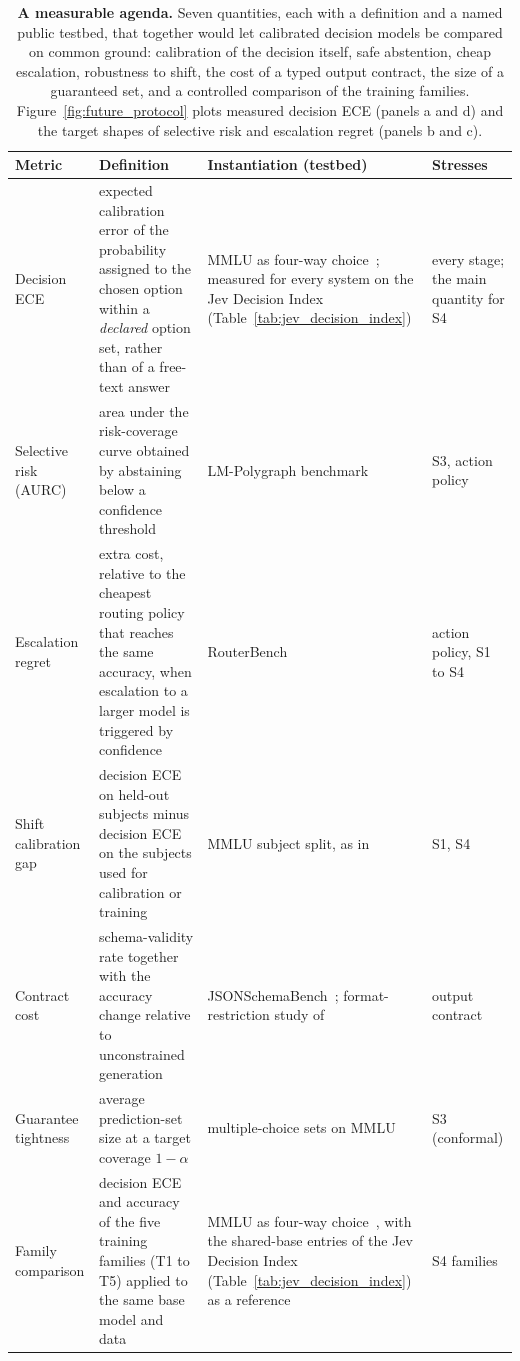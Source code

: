 \begin{table}[tp]
\centering\footnotesize
\renewcommand{\arraystretch}{1.18}
\caption{\textbf{A measurable agenda.} Seven quantities, each with a definition and a named public
testbed, that together would let calibrated decision models be compared on common ground:
calibration of the decision itself, safe abstention, cheap escalation, robustness to shift, the cost
of a typed output contract, the size of a guaranteed set, and a controlled comparison of the training families. Figure~\ref{fig:future_protocol} plots
measured decision ECE (panels a and d) and the target shapes of selective risk and escalation regret
(panels b and c).}
\label{tab:future_metrics}
\begin{tabular}{@{}>{\raggedright\arraybackslash}p{}
                  >{\raggedright\arraybackslash}p{}
                  >{\raggedright\arraybackslash}p{}
                  >{\raggedright\arraybackslash}p{}@{}}
\toprule
\textbf{Metric} & \textbf{Definition} & \textbf{Instantiation (testbed)} & \textbf{Stresses} \\
\midrule
Decision ECE & expected calibration error of the probability assigned to the chosen option within a \emph{declared} option set, rather than of a free-text answer & MMLU as four-way choice~\citep{hendrycks2020measuring}; measured for every system on the Jev Decision Index (Table~\ref{tab:jev_decision_index}) & every stage; the main quantity for S4 \\
Selective risk (AURC) & area under the risk-coverage curve obtained by abstaining below a confidence threshold~\citep{geifman2017selective} & LM-Polygraph benchmark~\citep{vashurin2024benchmarking} & S3, action policy \\
Escalation regret & extra cost, relative to the cheapest routing policy that reaches the same accuracy, when escalation to a larger model is triggered by confidence & RouterBench~\citep{hu2024routerbench} & action policy, S1 to S4 \\
Shift calibration gap & decision ECE on held-out subjects minus decision ECE on the subjects used for calibration or training & MMLU subject split, as in~\citet{shen2024thermometer} & S1, S4 \\
Contract cost & schema-validity rate together with the accuracy change relative to unconstrained generation & JSONSchemaBench~\citep{geng2025jsonschemabench}; format-restriction study of~\citet{tam2024speak} & output contract \\
Guarantee tightness & average prediction-set size at a target coverage $1-\alpha$ & multiple-choice sets on MMLU~\citep{hendrycks2020measuring} & S3 (conformal) \\
Family comparison & decision ECE and accuracy of the five training families (T1 to T5) applied to the same base model and data & MMLU as four-way choice~\citep{hendrycks2020measuring}, with the shared-base entries of the Jev Decision Index (Table~\ref{tab:jev_decision_index}) as a reference & S4 families \\
\bottomrule
\end{tabular}
\end{table}
